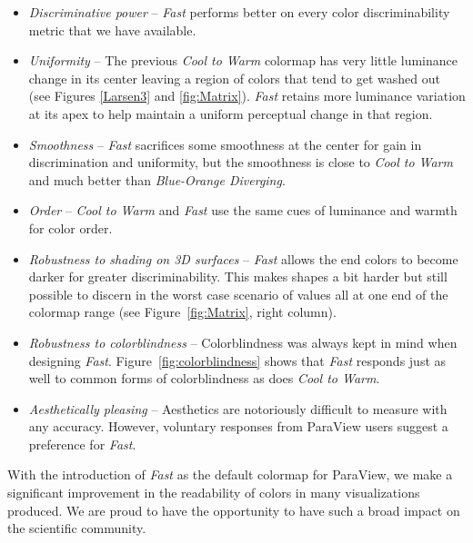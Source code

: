 \documentclass{IEEEcsmag}
\newcommand*{\colormap}[1]{\textsl{#1}\xspace}
\newcommand*{\coolwarm}{\colormap{Cool to Warm}}
\newcommand*{\blueorange}{\colormap{Blue-Orange Diverging}}
\newcommand*{\fast}{\colormap{Fast}}
\begin{document}
\begin{itemize}

\item \emph{Discriminative power} --
  \fast performs better on every color discriminability metric that we have available.
\item \emph{Uniformity} --
  The previous \coolwarm colormap has very little luminance change in its center leaving a region of colors that tend to get washed out (see Figures \ref{Larsen3} and \ref{fig:Matrix}).
  \fast retains more luminance variation at its apex to help maintain a uniform perceptual change in that region.
\item \emph{Smoothness} --
  \fast sacrifices some smoothness at the center for gain in discrimination and uniformity, but the smoothness is close to \coolwarm and much better than \blueorange.
\item \emph{Order} --
  \coolwarm and \fast use the same cues of luminance and warmth for color order.
\item \emph{Robustness to shading on 3D surfaces} --
  \fast allows the end colors to become darker for greater discriminability.
  This makes shapes a bit harder but still possible to discern in the worst case scenario of values all at one end of the colormap range (see Figure~\ref{fig:Matrix}, right column).
\item \emph{Robustness to colorblindness} --
  Colorblindness was always kept in mind when designing \fast.
  Figure~\ref{fig:colorblindness} shows that \fast responds just as well to common forms of colorblindness as does \coolwarm.
\item \emph{Aesthetically pleasing} --
  Aesthetics are notoriously difficult to measure with any accuracy.
  However, voluntary responses from ParaView users suggest a preference for \fast.

\end{itemize}



With the introduction of \fast as the default colormap for ParaView, we make a significant improvement in the readability of colors in many visualizations produced. We are proud to have the opportunity to have such a broad impact on the scientific community.
\end{document}
